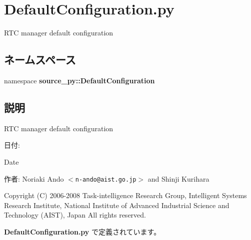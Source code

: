 \section{DefaultConfiguration.py}
\label{_default_configuration_8py}
RTC manager default configuration 

\subsection*{ネームスペース}
\begin{CompactItemize}
\item 
namespace \textbf{source\_\-py::DefaultConfiguration}
\end{CompactItemize}


\subsection{説明}
RTC manager default configuration 

\begin{Desc}
\item[日付:]\end{Desc}
\begin{Desc}
\item[Date]\end{Desc}
\begin{Desc}
\item[作者:]Noriaki Ando $<${\tt n-ando@aist.go.jp}$>$ and Shinji Kurihara\end{Desc}
Copyright (C) 2006-2008 Task-intelligence Research Group, Intelligent Systems Research Institute, National Institute of Advanced Industrial Science and Technology (AIST), Japan All rights reserved. 

 {\bf DefaultConfiguration.py} で定義されています。
